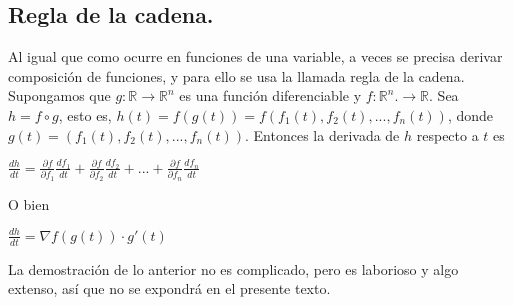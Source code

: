 \documentclass{book}
\begin{document}
\subsection{Regla de la cadena.}
Al igual que como ocurre en funciones de una variable, a veces se precisa derivar composición de funciones, y para ello se usa la llamada regla de la cadena. Supongamos que $g: \mathbb{R} \rightarrow \mathbb{R}^n$ es una función diferenciable y $f: \mathbb{R}^n. \rightarrow \mathbb{R}$. Sea $h=f\circ g$, esto es, $h(t)=f(g(t))=f(f_1(t),f_2(t),...,f_n(t))$, donde $g(t)=(f_1(t),f_2(t),...,f_n(t))$. Entonces la derivada de $h$ respecto a $t$ es
\begin{center}
    $\frac{dh}{dt}=\frac{\partial f}{\partial f_1}\frac{df_1}{dt}+\frac{\partial f}{\partial f_2}\frac{df_2}{dt}+...+\frac{\partial f}{\partial f_n}\frac{df_n}{dt}$
\end{center}
O bien
\begin{center}
    $\frac{dh}{dt}=\nabla f(g(t))\cdot g'(t)$
\end{center}
La demostración de lo anterior no es complicado, pero es laborioso y algo extenso, así que no se expondrá en el presente texto.
\end{document}
